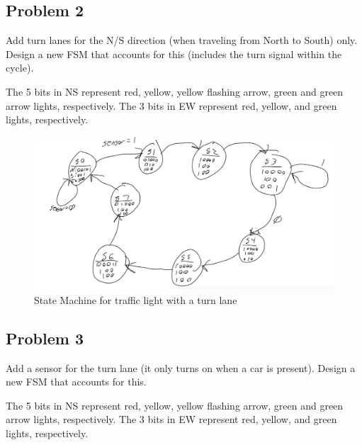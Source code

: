 \documentclass[11pt]{article}
\begin{document}
\subsection{Problem 2}
Add turn lanes for the N/S direction (when traveling from North to South) only. Design a new FSM that accounts for this (includes the turn signal within the cycle). 

The 5 bits in NS represent red, yellow, yellow flashing arrow, green and green arrow lights, respectively.
The 3 bits in EW represent red, yellow, and green lights, respectively.

\begin{figure}[H]
\begin{center}
	\includegraphics[width=\textwidth]{./9images/trafficLightWithTurn.png}
	\caption{\label{fig:trafficLightWithTurn}State Machine for traffic light with a turn lane}
\end{center}
\end{figure}

\subsection{Problem 3}
Add a sensor for the turn lane (it only turns on when a car is present). Design a new FSM that accounts for this.

The 5 bits in NS represent red, yellow, yellow flashing arrow, green and green arrow lights, respectively.
The 3 bits in EW represent red, yellow, and green lights, respectively.
\end{document}
